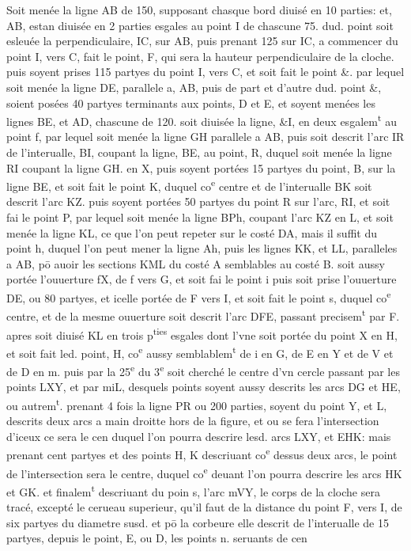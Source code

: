 \documentclass[11pt,a4paper]{article}
\begin{document}
Soit menée la ligne AB de 150, supposant chasque bord diuisé en 10 parties: et, AB, estan diuisée en 2 parties esgales au point I de chascune 75. dud. point soit esleuée la perpendiculaire, IC, sur AB, puis prenant 125 sur IC, a commencer du point I, vers C, \ill{} fait le point, F, qui sera la hauteur perpendiculaire de la cloche. puis soyent prises 115 partyes du point I, vers C, et soit fait le point \&. par lequel soit menée la ligne DE, parallele a, AB, puis de part et d'autre dud. point \&, soient posées 40 partyes \ill{} terminants aux points, D et E, et soyent menées les lignes BE, et AD, chascune de 120. \ill{} soit diuisée la ligne, \&I, en deux esgalem\textsuperscript{t} au point f, par lequel soit menée la ligne GH \ill{} parallele a AB, puis soit descrit l'arc IR de l'interualle, BI, coupant la ligne, BE, au point, R, duquel soit menée la ligne RI coupant la ligne GH. en X, puis soyent portées 15 partyes du point, B, sur la ligne BE, et soit fait le point K, duquel co\textsuperscript{e} centre et de l'interualle BK soit descrit l'arc KZ. puis soyent portées 50 partyes du point R sur l'arc, RI, et soit fai le point P, par lequel soit menée la ligne BPh, coupant l'arc KZ en L, et soit menée la ligne KL, ce que l'on peut repeter sur le costé DA, mais il suffit du point h, duquel l'on peut mener la ligne Ah, puis les lignes KK, et LL, paralleles a AB, pō auoir les sections KML du costé A semblables au costé B. soit aussy portée l'ouuerture fX, de f vers G, et soit fai le point i puis soit prise l'ouuerture DE, ou 80 partyes, et icelle portée de F vers I, et soit fait le point s, duquel co\textsuperscript{e} centre, et de la mesme ouuerture soit descrit l'arc DFE, passant precisem\textsuperscript{t} par F. apres soit diuisé KL en trois p\textsuperscript{ties} esgales dont l'vne soit portée du point X en H, et soit fait led. point, H, co\textsuperscript{e} aussy semblablem\textsuperscript{t} de i en G, de E en Y et de \ill{} V et de D en m. puis par la 25\textsuperscript{e} du 3\textsuperscript{e} soit cherché le centre d'vn cercle passant par les \ill{} points LXY, et par miL, desquels points soyent aussy descrits les arcs DG et HE, ou autrem\textsuperscript{t}. prenant 4 fois la ligne PR ou 200 parties, soyent du point Y, et L, descrits deux arcs a main droitte \ill{} hors de la figure, et ou se fera l'intersection d'iceux ce sera le cen duquel l'on pourra \ill{} descrire lesd. arcs LXY, et EHK: mais prenant cent partyes et des points H, K descriuant co\textsuperscript{e} dessus deux arcs, le point de l'intersection sera le centre, duquel co\textsuperscript{e} deuant  l'on pourra descrire les arcs HK et GK. et finalem\textsuperscript{t} descriuant du poin s, l'arc mVY, le corps de la cloche sera tracé, excepté le cerueau superieur, qu'il faut \ill{} de la distance du point F, vers I, de six partyes du diametre susd. et pō la corbeure elle \ill{} descrit de l'interualle de 15 partyes, depuis le point, E, ou D, les points n. seruants de cen
\end{document}
